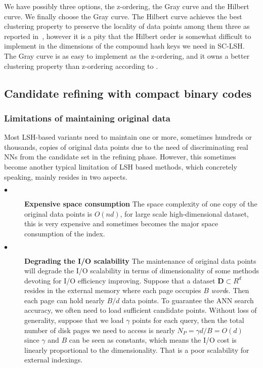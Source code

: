 \documentclass[twocolumn]{svjour3}          %
\begin{document}
We have possibly three options, the z-ordering, the Gray curve and the Hilbert curve. We finally choose the Gray curve. The Hilbert curve achieves the best clustering property to preserve the locality of data points among them three as reported in~\cite{Faloutsos1989Fractals}, however it is a pity that the Hilbert order is somewhat difficult to implement in the dimensions of the compound hash keys we need in SC-LSH. The Gray curve is as easy to implement as the z-ordering, and it owns a better clustering property than z-ordering according to \cite{Faloutsos1989Fractals}.

\subsection{Candidate refining with compact binary codes}
\label{ssec:introPQ}
\subsubsection{Limitations of maintaining original data}\label{sssec:originallimitations}
Most LSH-based variants need to maintain one or more, sometimes hundreds or thousands, copies of original data points due to the need of discriminating real NNs from the candidate set in the refining phase. However, this sometimes become another typical limitation of LSH based methods, which concretely speaking, mainly resides in two aspects.
\begin{description}
  \item[$\bullet$] \textbf{Expensive space consumption} The space complexity of one copy of the original data points is $O(nd)$, for large scale high-dimensional dataset, this is very expensive and sometimes becomes the major space consumption of the index.
  \item[$\bullet$] %
    \textbf{Degrading the I/O scalability} The maintenance of original data points will degrade the I/O scalability in terms of dimensionality of some methods devoting for I/O efficiency improving. Suppose that a dataset $\textbf{D}\subset R^d$ resides in the external memory where each page occupies $B$ \emph{word}s. Then each page can hold nearly $B/d$ data points. To guarantee the ANN search accuracy, we often need to load sufficient candidate points. Without loss of generality, suppose that we load $\gamma$ points for each query, then the total number of disk pages we need to access is nearly $N_P=\gamma d/B=O(d)$ since $\gamma$ and $B$ can be seen as constants, which means the I/O cost is linearly proportional to the dimensionality. That is a poor scalability for external indexings.
\end{description}
\end{document}
